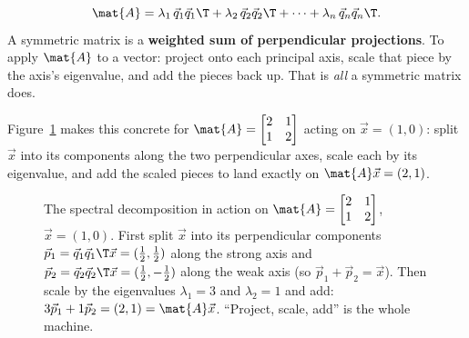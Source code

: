 \begin{focusbox}
\[
  \mat{A} = \lambda_1\,\vec{q}_1\vec{q}_1\T + \lambda_2\,\vec{q}_2\vec{q}_2\T + \cdots + \lambda_n\,\vec{q}_n\vec{q}_n\T.
\]
A symmetric matrix is a \textbf{weighted sum of perpendicular projections}. To
apply $\mat{A}$ to a vector: project onto each principal axis, scale that piece by
the axis's eigenvalue, and add the pieces back up. That is \emph{all} a symmetric
matrix does.
\end{focusbox}

Figure~\ref{ch26:fig-projsum} makes this concrete for
$\mat{A}=\begin{bmatrix}2&1\\1&2\end{bmatrix}$ acting on $\vec{x}=(1,0)$: split
$\vec{x}$ into its components along the two perpendicular axes, scale each by its
eigenvalue, and add the scaled pieces to land exactly on $\mat{A}\vec{x}=(2,1)$.

\begin{figure}[H]
\centering
{}
\caption{The spectral decomposition in action on
$\mat{A}=\protect\begin{bmatrix}2&1\\1&2\protect\end{bmatrix}$, $\vec{x}=(1,0)$.
First split $\vec{x}$ into its perpendicular components
$\vec{p}_1=\vec{q}_1\vec{q}_1\T\vec{x}=(\tfrac12,\tfrac12)$ along the strong axis
and $\vec{p}_2=\vec{q}_2\vec{q}_2\T\vec{x}=(\tfrac12,-\tfrac12)$ along the weak
axis (so $\vec{p}_1+\vec{p}_2=\vec{x}$). Then scale by the eigenvalues
$\lambda_1=3$ and $\lambda_2=1$ and add: $3\vec{p}_1+1\vec{p}_2=(2,1)=\mat{A}\vec{x}$.
``Project, scale, add'' is the whole machine.}
\label{ch26:fig-projsum}
\end{figure}

